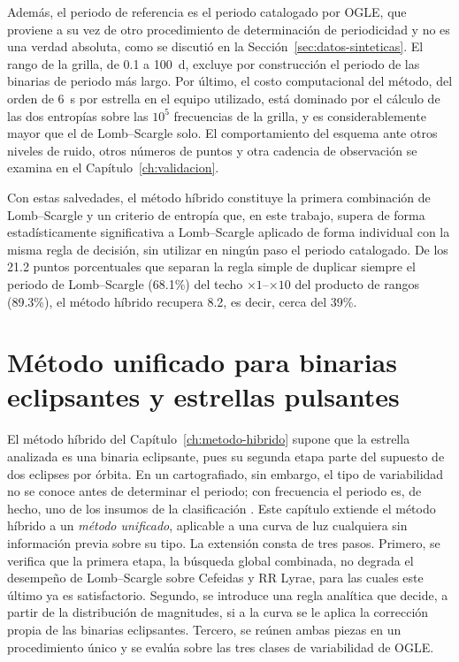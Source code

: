 \documentclass[12pt,letterpaper,oneside]{book}
\begin{document}
Adem\'as, el periodo de referencia es el periodo catalogado por OGLE, que proviene a su vez de otro procedimiento de determinaci\'on de periodicidad y no es una verdad absoluta, como se discuti\'o en la Secci\'on~\ref{sec:datos-sinteticas}. El rango de la grilla, de 0.1 a 100~d, excluye por construcci\'on el periodo de las binarias de periodo m\'as largo. Por \'ultimo, el costo computacional del m\'etodo, del orden de 6~s por estrella en el equipo utilizado, est\'a dominado por el c\'alculo de las dos entrop\'ias sobre las $10^5$ frecuencias de la grilla, y es considerablemente mayor que el de Lomb--Scargle solo. El comportamiento del esquema ante otros niveles de ruido, otros n\'umeros de puntos y otra cadencia de observaci\'on se examina en el Cap\'itulo~\ref{ch:validacion}.

Con estas salvedades, el m\'etodo h\'ibrido constituye la primera combinaci\'on de Lomb--Scargle y un criterio de entrop\'ia que, en este trabajo, supera de forma estad\'isticamente significativa a Lomb--Scargle aplicado de forma individual con la misma regla de decisi\'on, sin utilizar en ning\'un paso el periodo catalogado. De los 21.2 puntos porcentuales que separan la regla simple de duplicar siempre el periodo de Lomb--Scargle (68.1\%) del techo $\times1$--$\times10$ del producto de rangos (89.3\%), el m\'etodo h\'ibrido recupera 8.2, es decir, cerca del 39\%.


\chapter{M\'etodo unificado para binarias eclipsantes y estrellas pulsantes}
\label{ch:metodo-unificado}

El m\'etodo h\'ibrido del Cap\'itulo~\ref{ch:metodo-hibrido} supone que la estrella analizada es una binaria eclipsante, pues su segunda etapa parte del supuesto de dos eclipses por \'orbita. En un cartografiado, sin embargo, el tipo de variabilidad no se conoce antes de determinar el periodo; con frecuencia el periodo es, de hecho, uno de los insumos de la clasificaci\'on \citep{SanchezSaez2021}. Este cap\'itulo extiende el m\'etodo h\'ibrido a un \emph{m\'etodo unificado}, aplicable a una curva de luz cualquiera sin informaci\'on previa sobre su tipo. La extensi\'on consta de tres pasos. Primero, se verifica que la primera etapa, la b\'usqueda global combinada, no degrada el desempe\~no de Lomb--Scargle sobre Cefeidas y RR Lyrae, para las cuales este \'ultimo ya es satisfactorio. Segundo, se introduce una regla anal\'itica que decide, a partir de la distribuci\'on de magnitudes, si a la curva se le aplica la correcci\'on propia de las binarias eclipsantes. Tercero, se re\'unen ambas piezas en un procedimiento \'unico y se eval\'ua sobre las tres clases de variabilidad de OGLE.
\end{document}

